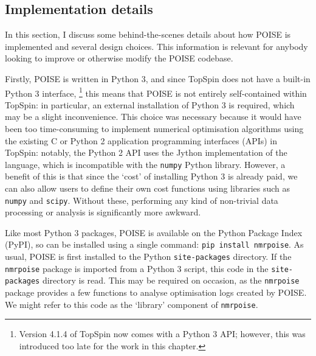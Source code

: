 \subsection{Implementation details}
\label{subsec:poise__implementation}

In this section, I discuss some behind-the-scenes details about how POISE is implemented and several design choices.
This information is relevant for anybody looking to improve or otherwise modify the POISE codebase.

Firstly, POISE is written in Python 3, and since TopSpin does not have a built-in Python 3 interface,%
\footnote{Version 4.1.4 of TopSpin now comes with a Python 3 API; however, this was introduced too late for the work in this chapter.}
this means that POISE is not entirely self-contained within TopSpin: in particular, an external installation of Python 3 is required, which may be a slight inconvenience.
This choice was necessary because it would have been too time-consuming to implement numerical optimisation algorithms using the existing C or Python 2 application programming interfaces (APIs) in TopSpin: notably, the Python 2 API uses the Jython implementation of the language, which is incompatible with the \texttt{numpy} Python library.
However, a benefit of this is that since the `cost' of installing Python 3 is already paid, we can also allow users to define their own cost functions using libraries such as \texttt{numpy} and \texttt{scipy}.
Without these, performing any kind of non-trivial data processing or analysis is significantly more awkward.

Like most Python 3 packages, POISE is available on the Python Package Index (PyPI), so can be installed using a single command: \texttt{pip install nmrpoise}.
As usual, POISE is first installed to the Python \texttt{site-packages} directory.
If the \texttt{nmrpoise} package is imported from a Python 3 script, this code in the \texttt{site-packages} directory is read.
This may be required on occasion, as the \texttt{nmrpoise} package provides a few functions to analyse optimisation logs created by POISE.
We might refer to this code as the `library' component of \texttt{nmrpoise}.

